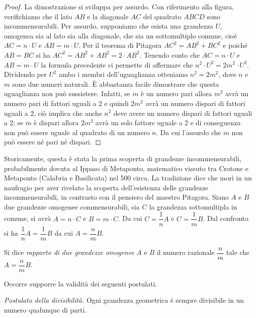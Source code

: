 \begin{proof}
La dimostrazione si sviluppa per assurdo. Con riferimento alla 
figura, verifichiamo che  il lato \(AB\) e la diagonale \(AC\) del 
quadrato \(ABCD\) sono incommensurabili.
Per assurdo, supponiamo che esista una grandezza \(U\), omogenea sia al 
lato sia alla diagonale, che sia un sottomultiplo comune, cioè 
\(AC=n\cdot U\) e \(AB=m\cdot U\).
Per il teorema di Pitagora \(AC^2=AB^2+BC^2\) e poiché \(AB=BC\) si ha 
\(AC^2=AB^2+AB^2=2\cdot AB^2\). Tenendo conto che \(AC=n\cdot U\) e 
\(AB=m\cdot U\) la formula precedente ci permette di affermare che 
\(n^2\cdot U^2=2m^2\cdot U^2\). Dividendo per \(U^2\) ambo i membri 
dell'uguaglianza otteniamo \(n^2=2m^2\), dove \(n\) e \(m\) sono due numeri 
naturali. \`E abbastanza facile dimostrare che questa uguaglianza non 
può sussistere. Infatti, se \(m\) è un numero pari allora \(m^2\) avrà un 
numero pari di fattori uguali a 2 e quindi \(2m^2\) avrà un numero 
dispari di fattori uguali a 2, ciò implica che anche \(n^2\) deve avere 
un numero dispari di fattori uguali a 2; se \(m\) è dispari allora 
\(2m^2\) avrà un solo fattore uguale a 2 e di conseguenza non può 
essere uguale al quadrato di un numero \(n\). Da cui l'assurdo che \(m\) 
non può essere né pari né dispari.
\end{proof}

Storicamente, questa è stata la prima scoperta di grandezze 
incommensurabili, probabilmente dovuta al Ippaso di Metaponto, 
matematico vissuto tra Crotone e Metaponto (Calabria e Basilicata) 
nel 500 \aC circa. La tradizione dice che morì in un naufragio per 
aver rivelato la scoperta dell'esistenza delle grandezze 
incommensurabili, in contrasto con il pensiero del maestro Pitagora.
Siano \(A\) e \(B\) due grandezze omogenee commensurabili, sia \(C\) la 
grandezza sottomultipla in comune, si avrà \(A=n\cdot C\) e \(B=m\cdot 
C\). Da cui \(C=\dfrac{1}{n}A\) e \(C=\dfrac{1}{m}B\). Dal confronto si ha 
\(\dfrac{1}{n}A=\dfrac{1}{m}B\) da cui \(A=\dfrac{n}{m}B\).

\begin{definizione}
Si dice \emph{rapporto di due grandezze omogenee} \(A\) e \(B\) il numero 
razionale \(\dfrac{n}{m}\) tale che \(A=\dfrac{n}{m}B\).
\end{definizione}
Occorre supporre la validità dei seguenti postulati.\vspace{8pt}

\noindent \emph{Postulato della divisibilità.} Ogni grandezza 
geometrica è sempre divisibile in un numero qualunque di 
parti.\vspace{8pt}


